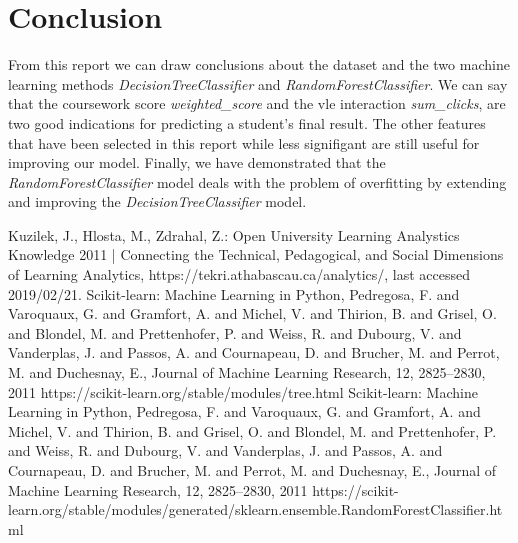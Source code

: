 \documentclass[8pt]{article}
\begin{document}
\section{Conclusion}
From this report we can draw conclusions about the dataset and the two machine learning methods \textit{DecisionTreeClassifier} and \textit{RandomForestClassifier}. We can say that the coursework score \textit{weighted\_score} and the vle interaction \textit{sum\_clicks}, are two good indications for predicting a student's final result. The other features that have been selected in this report while less signifigant are still useful for improving our model. Finally, we have demonstrated that the \textit{RandomForestClassifier} model deals with the problem of overfitting by extending and improving the \textit{DecisionTreeClassifier} model.
\begin{thebibliography}{2}
Kuzilek, J., Hlosta, M., Zdrahal, Z.: Open University Learning Analystics Knowledge 2011 | Connecting the Technical, Pedagogical, and Social Dimensions of Learning Analytics, https://tekri.athabascau.ca/analytics/, last accessed 2019/02/21.
{Scikit-learn: Machine Learning in {P}ython},
{Pedregosa, F. and Varoquaux, G. and Gramfort, A. and Michel, V.
         and Thirion, B. and Grisel, O. and Blondel, M. and Prettenhofer, P.
         and Weiss, R. and Dubourg, V. and Vanderplas, J. and Passos, A. and
         Cournapeau, D. and Brucher, M. and Perrot, M. and Duchesnay, E.},
 {Journal of Machine Learning Research},
 {12},
 {2825--2830},
 {2011}
 https://scikit-learn.org/stable/modules/tree.html
{Scikit-learn: Machine Learning in {P}ython},
{Pedregosa, F. and Varoquaux, G. and Gramfort, A. and Michel, V.
         and Thirion, B. and Grisel, O. and Blondel, M. and Prettenhofer, P.
         and Weiss, R. and Dubourg, V. and Vanderplas, J. and Passos, A. and
         Cournapeau, D. and Brucher, M. and Perrot, M. and Duchesnay, E.},
 {Journal of Machine Learning Research},
 {12},
 {2825--2830},
 {2011}
https://scikit-learn.org/stable/modules/generated/sklearn.ensemble.RandomForestClassifier.html
\end{thebibliography}
\end{document}
